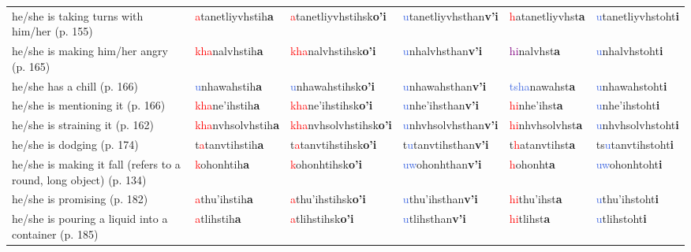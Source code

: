 \documentclass[oneside,openany]{book}%
\begin{document}
\begin{tabularx}{\textwidth}{>{\hsize=1.5\hsize\RaggedRight}X >{\hsize=0.9\hsize}X >{\hsize=0.9\hsize}X >{\hsize=0.9\hsize}X >{\hsize=0.9\hsize}X >{\hsize=0.9\hsize}X}
he/she is taking turns with him/her (p. 155)&\textcolor{Red}{a}tanetliyvhstih\textbf{a}&\textcolor{Red}{a}tanetliyvhstihsk\textbf{o'i}&\textcolor{RoyalBlue}{u}tanetliyvhsthan\textbf{v'i}&\textcolor{Red}{h}atanetliyvhst\textbf{a}&\textcolor{RoyalBlue}{u}tanetliyvhstoht\textbf{i}\\%
he/she is making him/her angry (p. 165)&\textcolor{Red}{kha}nalvhstih\textbf{a}&\textcolor{Red}{kha}nalvhstihsk\textbf{o'i}&\textcolor{RoyalBlue}{u}nhalvhsthan\textbf{v'i}&\textcolor{Purple}{hi}nalvhst\textbf{a}&\textcolor{RoyalBlue}{u}nhalvhstoht\textbf{i}\\%
he/she has a chill (p. 166)&\textcolor{RoyalBlue}{u}nhawahstih\textbf{a}&\textcolor{RoyalBlue}{u}nhawahstihsk\textbf{o'i}&\textcolor{RoyalBlue}{u}nhawahsthan\textbf{v'i}&\textcolor{RoyalBlue}{tsha}nawahst\textbf{a}&\textcolor{RoyalBlue}{u}nhawahstoht\textbf{i}\\%
he/she is mentioning it (p. 166)&\textcolor{Red}{kha}ne'ihstih\textbf{a}&\textcolor{Red}{kha}ne'ihstihsk\textbf{o'i}&\textcolor{RoyalBlue}{u}nhe'ihsthan\textbf{v'i}&\textcolor{Red}{hi}nhe'ihst\textbf{a}&\textcolor{RoyalBlue}{u}nhe'ihstoht\textbf{i}\\%
he/she is straining it (p. 162)&\textcolor{Red}{kha}nvhsolvhstih\textbf{a}&\textcolor{Red}{kha}nvhsolvhstihsk\textbf{o'i}&\textcolor{RoyalBlue}{u}nhvhsolvhsthan\textbf{v'i}&\textcolor{Red}{hi}nhvhsolvhst\textbf{a}&\textcolor{RoyalBlue}{u}nhvhsolvhstoht\textbf{i}\\%
he/she is dodging (p. 174)&t\textcolor{Red}{a}tanvtihstih\textbf{a}&t\textcolor{Red}{a}tanvtihstihsk\textbf{o'i}&t\textcolor{RoyalBlue}{u}tanvtihsthan\textbf{v'i}&t\textcolor{Red}{h}atanvtihst\textbf{a}&ts\textcolor{RoyalBlue}{u}tanvtihstoht\textbf{i}\\%
he/she is making it fall (refers to a round, long object) (p. 134)&\textcolor{Red}{k}ohonhtih\textbf{a}&\textcolor{Red}{k}ohonhtihsk\textbf{o'i}&\textcolor{RoyalBlue}{uw}ohonhthan\textbf{v'i}&\textcolor{Red}{h}ohonht\textbf{a}&\textcolor{RoyalBlue}{uw}ohonhtoht\textbf{i}\\%
he/she is promising (p. 182)&\textcolor{Red}{a}thu'ihstih\textbf{a}&\textcolor{Red}{a}thu'ihstihsk\textbf{o'i}&\textcolor{RoyalBlue}{u}thu'ihsthan\textbf{v'i}&\textcolor{Red}{hi}thu'ihst\textbf{a}&\textcolor{RoyalBlue}{u}thu'ihstoht\textbf{i}\\%
he/she is pouring a liquid into a container (p. 185)&\textcolor{Red}{a}tlihstih\textbf{a}&\textcolor{Red}{a}tlihstihsk\textbf{o'i}&\textcolor{RoyalBlue}{u}tlihsthan\textbf{v'i}&\textcolor{Red}{hi}tlihst\textbf{a}&\textcolor{RoyalBlue}{u}tlihstoht\textbf{i}\\%

\end{tabularx}
\end{document}
